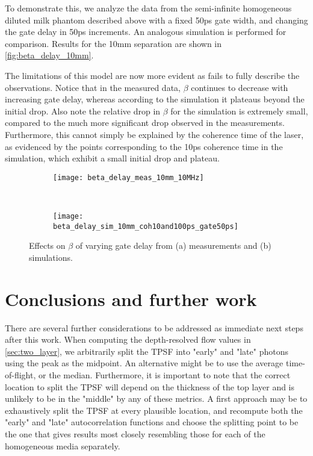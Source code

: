 To demonstrate this, we analyze the data from the semi-infinite homogeneous diluted milk phantom described above with a fixed 50ps gate width, and changing the gate delay in 50ps increments. An analogous simulation is performed for comparison. Results for the 10mm separation are shown in \autoref{fig:beta_delay_10mm}.

The limitations of this model are now more evident as fails to fully describe the observations. Notice that in the measured data, $\beta$ continues to decrease with increasing gate delay, whereas according to the simulation it plateaus beyond the initial drop. Also note the relative drop in $\beta$ for the simulation is extremely small, compared to the much more significant drop observed in the measurements. Furthermore, this cannot simply be explained by the coherence time of the laser, as evidenced by the points corresponding to the 10ps coherence time in the simulation, which exhibit a small initial drop and plateau.  


\begin{sidewaysfigure}
    \begin{subfigure}{0.5\textwidth}
        \centering
        \texttt{[image: beta\_delay\_meas\_10mm\_10MHz]}
        \caption{}
        \label{fig:beta_delay_meas_10mm}
    \end{subfigure}~%
    \begin{subfigure}{0.5\textwidth}
        \centering
        \texttt{[image: beta\_delay\_sim\_10mm\_coh10and100ps\_gate50ps]}
        \caption{}
        \label{fig:beta_delay_sim_10mm}
    \end{subfigure}
    \caption{Effects on $\beta$ of varying gate delay from (a) measurements and (b) simulations.}
    \label{fig:beta_delay_10mm}
\end{sidewaysfigure}





\section{Conclusions and further work}
There are several further considerations to be addressed as immediate next steps after this work. When computing the depth-resolved flow values in \autoref{sec:two_layer}, we arbitrarily split the TPSF into "early" and "late" photons using the peak as the midpoint. An alternative might be to use the average time-of-flight, or the median. Furthermore, it is important to note that the correct location to split the TPSF will depend on the thickness of the top layer and is unlikely to be in the "middle" by any of these metrics. A first approach may be to exhaustively split the TPSF at every plausible location, and recompute both the "early" and "late" autocorrelation functions and choose the splitting point to be the one that gives results most closely resembling those for each of the homogeneous media separately.

